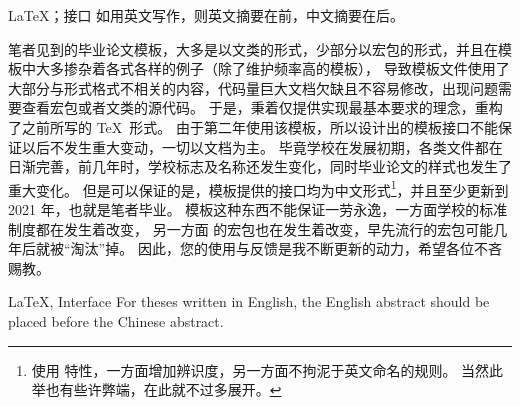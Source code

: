 
\begin{中文摘要}{\LaTeX ；接口}
  如用英文写作，则英文摘要在前，中文摘要在后。

  笔者见到的毕业论文模板，大多是以文类的形式，少部分以宏包的形式，并且在模板中大多掺杂着各式各样的例子（除了维护频率高的模板），
  导致模板文件使用了大部分与形式格式不相关的内容，代码量巨大文档欠缺且不容易修改，出现问题需要查看宏包或者文类的源代码。
  于是，秉着仅提供实现最基本要求的理念，重构了之前所写的 \TeX\ 形式。
  由于第二年使用该模板，所以设计出的模板接口不能保证以后不发生重大变动，一切以文档为主。
  毕竟学校在发展初期，各类文件都在日渐完善，前几年时，学校标志及名称还发生变化，同时毕业论文的样式也发生了重大变化。
  但是可以保证的是，模板提供的接口均为中文形式\footnote{
    使用  特性，一方面增加辨识度，另一方面不拘泥于英文命名的规则。
    当然此举也有些许弊端，在此就不过多展开。
  }，并且至少更新到 2021 年，也就是笔者毕业。
  模板这种东西不能保证一劳永逸，一方面学校的标准制度都在发生着改变，
  另一方面  的宏包也在发生着改变，早先流行的宏包可能几年后就被“淘汰”掉。
  因此，您的使用与反馈是我不断更新的动力，希望各位不吝赐教。
\end{中文摘要}

\begin{英文摘要}{LaTeX, Interface}
  For theses written in English, the English abstract should be placed before the Chinese abstract.

  \lipsum[1]
\end{英文摘要}
\cleardoublepage
